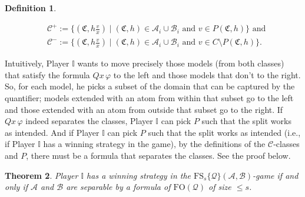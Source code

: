 \documentclass{article}
\newtheorem{theorem}{Theorem}[section]
\theoremstyle{definition}
\newtheorem{definition}[theorem]{Definition}
\begin{document}
\begin{definition}
\begin{enumerate}
\begin{enumerate}
            \begin{align*}
                &\mathcal{C}^+:=\{(\mathfrak{C},h \frac{v}{x})\mid (\mathfrak{C},h)\in \mathcal{A}_i\cup \mathcal{B}_i \text{ and }v\in P(\mathfrak{C},h)\} \text{ and}\\
                &\mathcal{C}^-:=\{(\mathfrak{C},h \frac{v}{x})\mid (\mathfrak{C},h)\in \mathcal{A}_i\cup \mathcal{B}_i \text{ and }v\in C\setminus P(\mathfrak{C},h)\}.
            \end{align*}
        \end{enumerate}
    \end{enumerate}
\end{definition}

Intuitively, Player $\mathbb{I}$ wants to move precisely those models (from both classes) that satisfy the formula $Qx\, \varphi$ to the left and those models that don't to the right. So, for each model, he picks a subset of the domain that can be captured by the quantifier; models extended with an atom from within that subset go to the left and those extended with an atom from outside that subset go to the right. If $Qx\, \varphi$ indeed separates the classes, Player $\mathbb{I}$ can pick $P$ such that the split works as intended. And if Player $\mathbb{I}$ can pick $P$ such that the split works as intended (i.e., if Player $\mathbb{I}$ has a winning strategy in the game), by the definitions of the $\mathcal{C}$-classes and $P$, there must be a formula that separates the classes. See the proof below.

\begin{theorem}\label{thm:width-game}
    Player $\mathbb{I}$ has a winning strategy in the $\mathrm{FS}_s\{\mathcal{Q}\}(\mathcal{A},\mathcal{B})$-game if and only if $\mathcal{A}$ and $\mathcal{B}$ are separable by a formula of $\mathrm{FO}(\mathcal{Q})$ of size $\leq s$.
\end{theorem}
\end{document}
